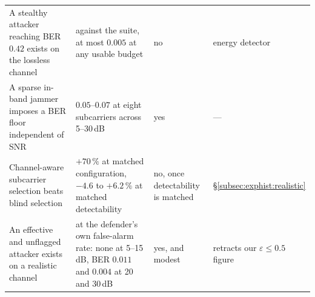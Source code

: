 \begin{table}[!t]
\begin{tabular}{p{} p{} l p{}}
A stealthy attacker reaching BER $0.42$ exists on the lossless channel
& against the suite, at most $0.005$ at any usable budget
& no
& energy detector \\

A sparse in-band jammer imposes a BER floor independent of SNR
& $0.05$--$0.07$ at eight subcarriers across 5--30\,dB
& yes & --- \\

Channel-aware subcarrier selection beats blind selection
& $+70\,\%$ at matched configuration, $-4.6$ to $+6.2\,\%$ at matched detectability
& no, once detectability is matched
& \S\ref{subsec:exphist:realistic} \\

An effective and unflagged attacker exists on a realistic channel
& at the defender's own false-alarm rate: none at 5--15\,dB, BER $0.011$ and $0.004$ at 20 and 30\,dB
& yes, and modest
& retracts our $\varepsilon \leq 0.5$ figure \\
\hline\hline
\end{tabular}
\end{table}

